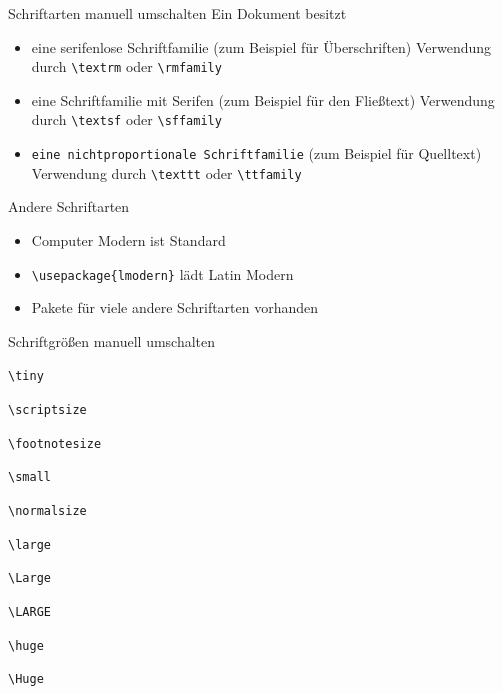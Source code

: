 \begin{Frame}[fragile]{Schriftarten manuell umschalten}
  Ein Dokument besitzt
  \begin{itemize}
    \item \textsf{eine serifenlose Schriftfamilie}\newline
      (zum Beispiel für Überschriften)\newline
      Verwendung durch \lstinline-\textrm- oder \lstinline-\rmfamily-
    \item \textrm{eine Schriftfamilie mit Serifen}\newline
      (zum Beispiel für den Fließtext)\newline
      Verwendung durch \lstinline-\textsf- oder \lstinline-\sffamily-
    \item \texttt{eine nichtproportionale Schriftfamilie}\newline
      (zum Beispiel für Quelltext)\newline
      Verwendung durch \lstinline-\texttt- oder \lstinline-\ttfamily-
  \end{itemize}

  \xxx

  \begin{exampleblock}{Andere Schriftarten}
    \begin{itemize}
      \item Computer Modern ist Standard
      \item \lstinline-\usepackage{lmodern}- lädt Latin Modern
      \item Pakete für viele andere Schriftarten vorhanden
    \end{itemize}
  \end{exampleblock}
\end{Frame}

\begin{Frame}[fragile]{Schriftgrößen manuell umschalten}
  \begin{center}
    \tiny \lstinline-\tiny-

    \scriptsize \lstinline-\scriptsize-

    \footnotesize \lstinline-\footnotesize-

    \small \lstinline-\small-

    \normalsize \lstinline-\normalsize-

    \large \lstinline-\large-

    \Large \lstinline-\Large-

    \LARGE \lstinline-\LARGE-

    \huge \lstinline-\huge-

    \Huge \lstinline-\Huge-
  \end{center}

  \normalsize
\end{Frame}

